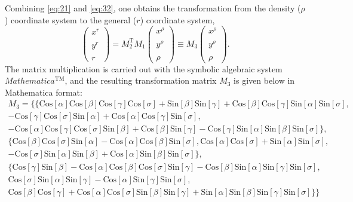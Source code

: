 \documentclass[12pt]{report}
\begin{document}
Combining \eqref{eq:21} and \eqref{eq:32}, one obtains the
transformation from the density ($\rho$) coordinate system to the
general ($r$) coordinate system,
\begin{equation}
\label{eq:33}
  \left(\begin{matrix} x^r\\ \\ y^r\\ \\ r\end{matrix}\right) =
  M_2^\textrm{T} M_1\left(\begin{matrix}x^\rho \\ \\ y^\rho \\ \\
      \rho\end{matrix}\right) \equiv M_3\left(\begin{matrix}x^\rho \\
      \\ y^\rho \\ \\ \rho\end{matrix}\right).
\end{equation}
The matrix multiplication is carried out with the symbolic algebraic
system $Mathematica^\textrm{TM}$, and the resulting transformation
matrix $M_3$ is given below in Mathematica format:
\begin{multline}
M_3 = \{\{\text{Cos}[\alpha ] \text{Cos}[\beta ]
  \text{Cos}[\gamma ] \text{Cos}[\sigma ]+\text{Sin}[\beta ]
  \text{Sin}[\gamma ]+\text{Cos}[\beta ] \text{Cos}[\gamma ]
  \text{Sin}[\alpha ] \text{Sin}[\sigma ],\\
-\text{Cos}[\gamma ]
  \text{Cos}[\sigma ] \text{Sin}[\alpha ]+\text{Cos}[\alpha ]
  \text{Cos}[\gamma ] \text{Sin}[\sigma ],\\
-\text{Cos}[\alpha ]
  \text{Cos}[\gamma ] \text{Cos}[\sigma ] \text{Sin}[\beta
  ]+\text{Cos}[\beta ] \text{Sin}[\gamma ]-\text{Cos}[\gamma ]
  \text{Sin}[\alpha ] \text{Sin}[\beta ] \text{Sin}[\sigma
  ]\},\\
\{\text{Cos}[\beta ] \text{Cos}[\sigma ] \text{Sin}[\alpha
  ]-\text{Cos}[\alpha ] \text{Cos}[\beta ] \text{Sin}[\sigma
  ],\text{Cos}[\alpha ] \text{Cos}[\sigma ]+\text{Sin}[\alpha ]
  \text{Sin}[\sigma ],\\
-\text{Cos}[\sigma ] \text{Sin}[\alpha ]
  \text{Sin}[\beta ]+\text{Cos}[\alpha ] \text{Sin}[\beta ]
  \text{Sin}[\sigma ]\},\\
\{\text{Cos}[\gamma ] \text{Sin}[\beta
  ]-\text{Cos}[\alpha ] \text{Cos}[\beta ] \text{Cos}[\sigma ]
  \text{Sin}[\gamma ]-\text{Cos}[\beta ] \text{Sin}[\alpha ]
  \text{Sin}[\gamma ] \text{Sin}[\sigma ],\\
\text{Cos}[\sigma ]
  \text{Sin}[\alpha ] \text{Sin}[\gamma ]-\text{Cos}[\alpha ]
  \text{Sin}[\gamma ] \text{Sin}[\sigma ],\\
\text{Cos}[\beta ]
  \text{Cos}[\gamma ]+\text{Cos}[\alpha ] \text{Cos}[\sigma ]
  \text{Sin}[\beta ] \text{Sin}[\gamma ]+\text{Sin}[\alpha ]
  \text{Sin}[\beta ] \text{Sin}[\gamma ] \text{Sin}[\sigma ]\}\} 
\end{multline}
\end{document}

